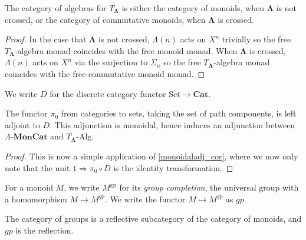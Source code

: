 \documentclass{amsbook} %
\newcommand{\mb}{\mathbf}
\newcommand{\Set}{\ensuremath{\textrm{Set}}}
\newcommand{\ML}{\mathbf{\Lambda}}
\newcommand{\lmc}{\Lambda\mbox{-}\mb{MonCat}}
\newcommand{\sets}{\Set}
\newcommand{\cat}{\ensuremath{\mb{Cat}}}
\numberwithin{section}{chapter}
\begin{document}
\begin{lem}
The category of algebras for $T_{\ML}$ is either the category of monoids, when $\ML$ is not crossed, or the category of commutative monoids, when $\ML$ is crossed.
\end{lem}
\begin{proof}
In the case that $\ML$ is not crossed, $\Lambda(n)$ acts on $X^n$ trivially so the free $T_{\ML}$-algebra monad coincides with the free monoid monad. When $\ML$ is crossed, $\Lambda(n)$ acts on $X^n$ via the surjection to $\Sigma_n$ so the free $T_{\ML}$-algebra monad coincides with the free commutative monoid monad.
\end{proof}

\begin{nota}
We write $D$ for the discrete category functor $\sets \to \cat$.
\end{nota}

\begin{prop}\label{pi0-D_adj}
The functor $\pi_0$ from categories to sets, taking the set of path components, is left adjoint to  $D$. This adjunction is monoidal, hence induces an adjunction between $\lmc$ and $T_{\ML}\mbox{-}\textrm{Alg}$.
\end{prop}
\begin{proof}
This is now a simple application of \cref{monoidaladj_cor}, where we now only note that the unit $1 \Rightarrow \pi_0 \circ D$ is the identity transformation.
\end{proof}



\begin{Defi} For a monoid $M$, we write $M^{\mathrm{gp}}$ for its \emph{group completion}, the universal group with a homomorphism $M \to M^{gp}$.  We write the functor $M \mapsto M^{gp}$ as $gp$.
\end{Defi}

\begin{rem}
The category of groups is a reflective subcategory of the category of monoids, and $gp$ is the reflection.
\end{rem}
\end{document}
